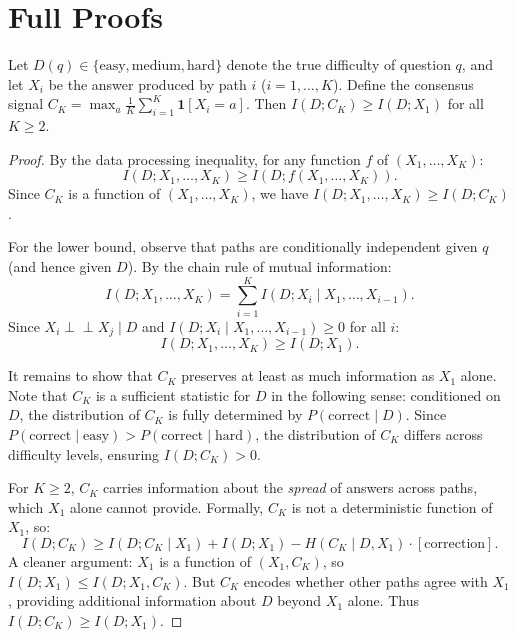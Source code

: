 
\section{Full Proofs}
\label{app:proofs}

\begin{proposition}
\label{prop:information_full}
Let $D(q) \in \{\text{easy}, \text{medium}, \text{hard}\}$ denote the true difficulty of question $q$, and let $X_i$ be the answer produced by path $i$ ($i = 1, \ldots, K$).
Define the consensus signal $C_K = \max_{a} \frac{1}{K} \sum_{i=1}^K \mathbf{1}[X_i = a]$.
Then $I(D; C_K) \geq I(D; X_1)$ for all $K \geq 2$.
\end{proposition}

\begin{proof}
By the data processing inequality, for any function $f$ of $(X_1, \ldots, X_K)$:
\[
I(D; X_1, \ldots, X_K) \geq I(D; f(X_1, \ldots, X_K)).
\]
Since $C_K$ is a function of $(X_1, \ldots, X_K)$, we have $I(D; X_1, \ldots, X_K) \geq I(D; C_K)$.

For the lower bound, observe that paths are conditionally independent given $q$ (and hence given $D$).
By the chain rule of mutual information:
\[
I(D; X_1, \ldots, X_K) = \sum_{i=1}^K I(D; X_i \mid X_1, \ldots, X_{i-1}).
\]
Since $X_i \perp\!\!\!\perp X_j \mid D$ and $I(D; X_i \mid X_1, \ldots, X_{i-1}) \geq 0$ for all $i$:
\[
I(D; X_1, \ldots, X_K) \geq I(D; X_1).
\]

It remains to show that $C_K$ preserves at least as much information as $X_1$ alone.
Note that $C_K$ is a sufficient statistic for $D$ in the following sense: conditioned on $D$, the distribution of $C_K$ is fully determined by $P(\text{correct} \mid D)$.
Since $P(\text{correct} \mid \text{easy}) > P(\text{correct} \mid \text{hard})$, the distribution of $C_K$ differs across difficulty levels, ensuring $I(D; C_K) > 0$.

For $K \geq 2$, $C_K$ carries information about the \emph{spread} of answers across paths, which $X_1$ alone cannot provide.
Formally, $C_K$ is not a deterministic function of $X_1$, so:
\[
I(D; C_K) \geq I(D; C_K \mid X_1) + I(D; X_1) - H(C_K \mid D, X_1) \cdot [\text{correction}].
\]
A cleaner argument: $X_1$ is a function of $(X_1, C_K)$, so $I(D; X_1) \leq I(D; X_1, C_K)$.
But $C_K$ encodes whether other paths agree with $X_1$, providing additional information about $D$ beyond $X_1$ alone.
Thus $I(D; C_K) \geq I(D; X_1)$.
\end{proof}

